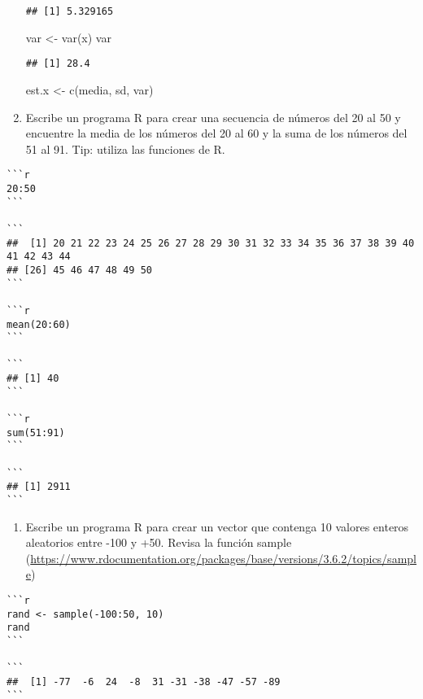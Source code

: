 \documentclass[
]{article}
\newenvironment{Shaded}{\begin{snugshade}}{\end{snugshade}}
\newcommand{\FunctionTok}[1]{\textcolor[rgb]{0.00,0.00,0.00}{#1}}
\newcommand{\NormalTok}[1]{#1}
\newcommand{\OtherTok}[1]{\textcolor[rgb]{0.56,0.35,0.01}{#1}}
\providecommand{\tightlist}{%
  \setlength{\itemsep}{0pt}\setlength{\parskip}{0pt}}
\begin{document}
\begin{enumerate}
\begin{verbatim}
## [1] 5.329165
\end{verbatim}

\begin{Shaded}
\begin{Highlighting}[]
\NormalTok{var }\OtherTok{\textless{}{-}} \FunctionTok{var}\NormalTok{(x)}
\NormalTok{var}
\end{Highlighting}
\end{Shaded}

\begin{verbatim}
## [1] 28.4
\end{verbatim}

\begin{Shaded}
\begin{Highlighting}[]
\NormalTok{est.x }\OtherTok{\textless{}{-}} \FunctionTok{c}\NormalTok{(media, sd, var)}
\end{Highlighting}
\end{Shaded}
\item
  Escribe un programa R para crear una secuencia de números del 20 al 50
  y encuentre la media de los números del 20 al 60 y la suma de los
  números del 51 al 91. Tip: utiliza las funciones de R.
\end{enumerate}

\begin{verbatim}
```r
20:50
```

```
##  [1] 20 21 22 23 24 25 26 27 28 29 30 31 32 33 34 35 36 37 38 39 40 41 42 43 44
## [26] 45 46 47 48 49 50
```

```r
mean(20:60)
```

```
## [1] 40
```

```r
sum(51:91)
```

```
## [1] 2911
```
\end{verbatim}

\begin{enumerate}
\def\labelenumi{\arabic{enumi}.}
\setcounter{enumi}{3}
\tightlist
\item
  Escribe un programa R para crear un vector que contenga 10 valores
  enteros aleatorios entre -100 y +50. Revisa la función sample
  (\url{https://www.rdocumentation.org/packages/base/versions/3.6.2/topics/sample})
\end{enumerate}

\begin{verbatim}
```r
rand <- sample(-100:50, 10)
rand
```

```
##  [1] -77  -6  24  -8  31 -31 -38 -47 -57 -89
```
\end{verbatim}
\end{document}
